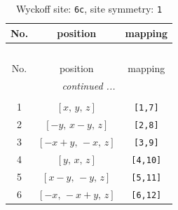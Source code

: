 \documentclass[fleqn,8pt]{jsarticle}
\begin{document}
\begin{longtable}{ccc}
\caption{Wyckoff site: {\tt 6c}, site symmetry: {\tt 1}}
 \\
 \hline \hline
No. & position & mapping \\ \hline \endfirsthead

\multicolumn{2}{l}{\tablename\ \thetable{}} \\
 \hline \hline
No. & position & mapping \\ \hline \endhead

 \hline \hline
\multicolumn{2}{r}{\footnotesize\it continued ...} \\ \endfoot

 \hline \hline
\multicolumn{2}{r}{} \\ \endlastfoot

1 & $\left[ x,\, y,\, z \right]$ & {\tt [1,7]} \\ \hline
2 & $\left[ - y,\, x - y,\, z \right]$ & {\tt [2,8]} \\ \hline
3 & $\left[ - x + y,\, - x,\, z \right]$ & {\tt [3,9]} \\ \hline
4 & $\left[ y,\, x,\, z \right]$ & {\tt [4,10]} \\ \hline
5 & $\left[ x - y,\, - y,\, z \right]$ & {\tt [5,11]} \\ \hline
6 & $\left[ - x,\, - x + y,\, z \right]$ & {\tt [6,12]} \\
\end{longtable}
\end{document}
